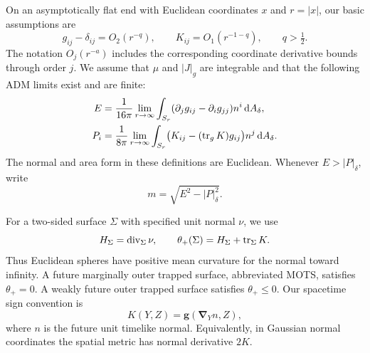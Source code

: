 On an asymptotically flat end with Euclidean coordinates \(x\) and
\(r=|x|\), our basic assumptions are
\begin{equation}\label{n3:intro:decay}
 g_{ij}-\delta_{ij}=O_2(r^{-q}),\qquad
 K_{ij}=O_1(r^{-1-q}),\qquad q>\tfrac12.
\end{equation}
The notation \(O_j(r^{-a})\) includes the corresponding coordinate
derivative bounds through order \(j\). We assume that \(\mu\) and
\(|J|_g\) are integrable and that the following ADM limits exist and are
finite:
\begin{align}
 E&=\frac1{16\pi}\lim_{r\to\infty}
   \int_{S_r}(\partial_jg_{ij}-\partial_i g_{jj})n^i
                    \,\mathrm d A_\delta,\label{n3:intro:energy}\\
 P_i&=\frac1{8\pi}\lim_{r\to\infty}
   \int_{S_r}\bigl(K_{ij}-(\operatorname{tr}_gK)g_{ij}\bigr)n^j
                    \,\mathrm d A_\delta.\label{n3:intro:momentum}
\end{align}
The normal and area form in these definitions are Euclidean. Whenever
\(E>|P|_\delta\), write
\begin{equation}\label{n3:intro:rest-mass}
                         m=\sqrt{E^2-|P|_\delta^2}.
\end{equation}

For a two-sided surface \(\Sigma\) with specified unit normal \(\nu\),
we use
\[
 H_\Sigma=\operatorname{div}_\Sigma\nu,\qquad
 \theta_+(\Sigma)=H_\Sigma+\operatorname{tr}_\Sigma K.
\]
Thus Euclidean spheres have positive mean curvature for the normal
toward infinity. A future marginally outer trapped surface, abbreviated
MOTS, satisfies \(\theta_+=0\). A weakly future outer trapped surface
satisfies \(\theta_+\le0\). Our spacetime sign convention is
\begin{equation}\label{n3:intro:k-sign}
 K(Y,Z)=\mathbf g(\mathbf\nabla_Y n,Z),
\end{equation}
where \(n\) is the future unit timelike normal. Equivalently, in Gaussian
normal coordinates the spatial metric has normal derivative \(2K\).

